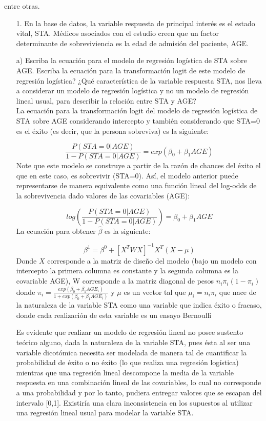 \documentclass[11pt,onside]{article}
\begin{document}
entre otras.

\begin{itemize}
\item[1.] En la base de datos, la variable respuesta de principal interés es el estado vital, STA. Médicos asociados con el estudio creen que un factor determinante de sobreviviencia es la edad de admisión del paciente, AGE.


\item[a)] Escriba la ecuación para el modelo de regresión logística de STA sobre AGE. Escriba la ecuación para la transformación logit de este modelo de regresión logística? ¿Qué característica de la variable respuesta STA, nos lleva a considerar un modelo de regresión logística y no un modelo de regresión lineal usual, para describir la relación entre STA y AGE?\\


La ecuación para la transformación logit del modelo de regresión logística de STA sobre AGE considerando intercepto y también considerando que STA=0 es el éxito (es decir, que la persona sobreviva) es la siguiente:

$$\frac{P(STA=0|AGE)}{1-P(STA=0|AGE)}=exp(\beta_{0}+\beta_{1}AGE)$$ 
Note que este modelo se construye a partir de la razón de chances del éxito el que en este caso, es sobrevivir (STA=0). Así, el modelo anterior puede representarse de manera equivalente como una función lineal del log-odds de la sobrevivencia dado valores de las covariables (AGE):

$$log \left( \frac{P(STA=0|AGE)}{1-P(STA=0|AGE)} \right)=\beta_{0}+\beta_{1}AGE$$ 
La ecuación para obtener $\hat{\beta}$ es la siguiente:

$$\beta^{1}=\beta^{0}+[X^{T}WX]^{-1}X^{T}(X-\mu)$$
Donde $X$ corresponde a la matriz de diseño del modelo (bajo un modelo con intercepto la primera columna es constante y la segunda columna es la covariable AGE), W corresponde a la matriz diagonal de pesos $n_{i}\pi_{i}(1-\pi_{i})$ donde $\pi_{i}=\frac{exp(\beta_{0}+\beta_{1}AGE_{i})} {1+exp(\beta_{0}+\beta_{1}AGE_{i})}$ y $\mu$ es un vector tal que $\mu_{i}=n_{i}\pi_{i}$ que nace de la naturaleza de la variable STA como una variable que indica éxito o fracaso, donde cada realización de esta variable es un ensayo Bernoulli

Es evidente que realizar un modelo de regresión lineal no posee sustento teórico alguno, dada la naturaleza de la variable STA, pues ésta al ser una variable dicotómica necesita ser modelada de manera tal de cuantificar la probabilidad de éxito o no éxito (lo que realiza una regresión logística) mientras que una regresión lineal descompone la media de la variable respuesta en una combinación lineal de las covariables, lo cual no corresponde a una probabilidad y por lo tanto, pudiera entregar valores que se escapan del intervalo [0,1]. Existiría una clara inconsistencia en los supuestos al utilizar una regresión lineal usual para modelar la variable STA.


\end{itemize}
\end{document}
